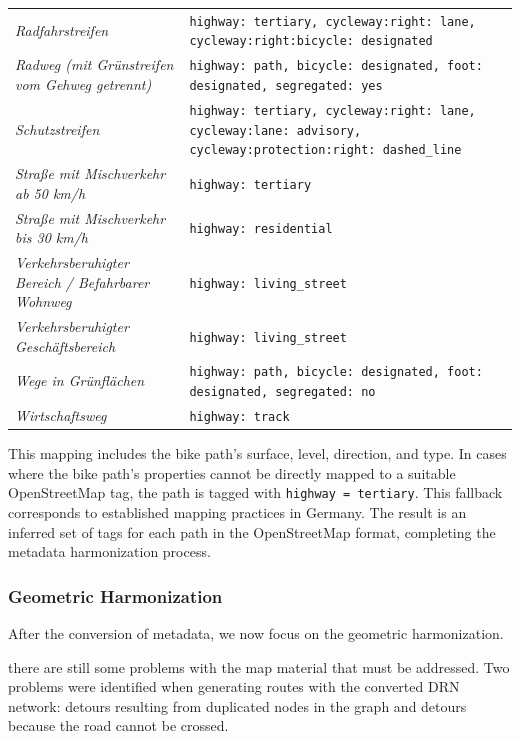 \begin{table}[htbp]
{\begin{tabular}{p{8cm}p{16cm}}
        \textit{Radfahrstreifen} & \texttt{highway: tertiary, cycleway:right: lane, cycleway:right:bicycle: designated} \\
        \textit{Radweg (mit Grünstreifen vom Gehweg getrennt)} & \texttt{highway: path, bicycle: designated, foot: designated, segregated: yes} \\
        \textit{Schutzstreifen} & \texttt{highway: tertiary, cycleway:right: lane, cycleway:lane: advisory, cycleway:protection:right: dashed\_line} \\
        \textit{Straße mit Mischverkehr ab 50 km/h} & \texttt{highway: tertiary} \\
        \textit{Straße mit Mischverkehr bis 30 km/h} & \texttt{highway: residential} \\
        \textit{Verkehrsberuhigter Bereich / Befahrbarer Wohnweg} & \texttt{highway: living\_street} \\
        \textit{Verkehrsberuhigter Geschäftsbereich} & \texttt{highway: living\_street} \\
        \textit{Wege in Grünflächen} & \texttt{highway: path, bicycle: designated, foot: designated, segregated: no} \\
        \textit{Wirtschaftsweg} & \texttt{highway: track} \\
        \hline
        
    \end{tabular}
    }
\end{table}

This mapping includes the bike path's surface, level, direction, and type. In cases where the bike path's properties cannot be directly mapped to a suitable OpenStreetMap tag, the path is tagged with \texttt{highway = tertiary}. This fallback corresponds to established mapping practices in Germany. The result is an inferred set of tags for each path in the OpenStreetMap format, completing the metadata harmonization process.

\subsubsection{Geometric Harmonization}

After the conversion of metadata, we now focus on the geometric harmonization. 

there are still some problems with the map material that must be addressed. Two problems were identified when generating routes with the converted DRN network: detours resulting from duplicated nodes in the graph and detours because the road cannot be crossed.

